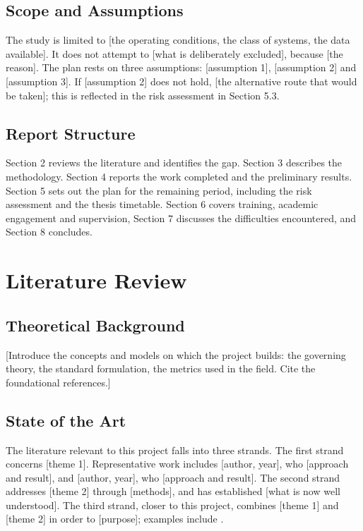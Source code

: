 \documentclass{article}
\begin{document}
\subsection{Scope and Assumptions}
The study is limited to [the operating conditions, the class of systems, the data available].
It does not attempt to [what is deliberately excluded], because [the reason]. The plan rests on
three assumptions: [assumption 1], [assumption 2] and [assumption 3]. If [assumption 2] does not
hold, [the alternative route that would be taken]; this is reflected in the risk assessment in
Section 5.3.

\subsection{Report Structure}
Section 2 reviews the literature and identifies the gap. Section 3 describes the methodology.
Section 4 reports the work completed and the preliminary results. Section 5 sets out the plan
for the remaining period, including the risk assessment and the thesis timetable. Section 6
covers training, academic engagement and supervision, Section 7 discusses the difficulties
encountered, and Section 8 concludes.

\section{Literature Review}

\subsection{Theoretical Background}
[Introduce the concepts and models on which the project builds: the governing theory, the
standard formulation, the metrics used in the field. Cite the foundational references.]

\subsection{State of the Art}
The literature relevant to this project falls into three strands. The first strand concerns
[theme 1]. Representative work includes [author, year], who [approach and result], and
[author, year], who [approach and result]. The second strand addresses [theme 2] through
[methods], and has established [what is now well understood]. The third strand, closer to this
project, combines [theme 1] and [theme 2] in order to [purpose]; examples include
\cite{vaswani2017attention, lecun2015deep}.
\end{document}

